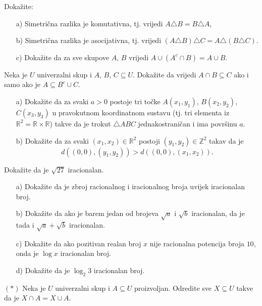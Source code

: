 \begin{exercise}
Dokažite:
\begin{itemize}
\item[a)] Simetrična razlika je komutativna, tj. vrijedi $A\triangle B=B\triangle A$,
\item[b)] Simetrična razlika je asocijativna, tj. vrijedi $(A\triangle B)\triangle C=A\triangle (B\triangle C)$.
\item[c)] Dokažite da za sve skupove $A$, $B$ vrijedi $A\cup (A^c\cap B)=A\cup B$.
\end{itemize}
\end{exercise}
\begin{exercise}
Neka je $U$ univerzalni skup i $A$, $B$, $C\subseteq U$. Dokažite da vrijedi $A\cap B\subseteq C$ ako i samo ako je $A\subseteq B^c\cup C$.
\end{exercise}
\begin{exercise} \textbf{}
\begin{itemize}
\item[a)] Dokažite da za svaki $a>0$ postoje tri točke $A(x_1, y_1)$, $B(x_2, y_2)$, $C(x_3, y_3)$ u pravokutnom koordinatnom sustavu (tj. tri elementa iz $\mathbb{R}^2=\mathbb{R}\times\mathbb{R}$) takve da je trokut $\triangle ABC$ jednakostraničan i ima površinu $a$.
\item[b)] Dokažite da za svaki $(x_1, x_2)\in \mathbb{R}^2$ postoji $(y_1, y_2)\in \mathbb{Z}^2$ takav da je $$d\left(\left(0, 0\right), \left(y_1, y_2\right)\right)>d\left(\left(0, 0\right), \left(x_1, x_2\right)\right).$$
\end{itemize}
\end{exercise}
\begin{exercise}
Dokažite da je $\sqrt{27}$ iracionalan.
\end{exercise}
\begin{exercise}\textbf{}
\begin{itemize}
\item[a)] Dokažite da je zbroj racionalnog i iracionalnog broja uvijek iracionalan broj.
\item[b)] Dokažite da ako je barem jedan od brojeva $\sqrt{a}$ i $\sqrt{b}$ iracionalan, da je tada i $\sqrt{a}+\sqrt{b}$ iracionalan.
\item[c)] Dokažite da ako pozitivan realan broj $x$ nije racionalna potencija broja $10$, onda je $\log{x}$ iracionalan broj.
\item[d)] Dokažite da je $\log_2{3}$ iracionalan broj.
\end{itemize}
\begin{exercise} $(*)$
Neka je $U$ univerzalni skup i $A\subseteq U$ proizvoljan. Odredite sve $X\subseteq U$ takve da je $X\cap A=X\cup A$.
\end{exercise}
\end{exercise}
\large